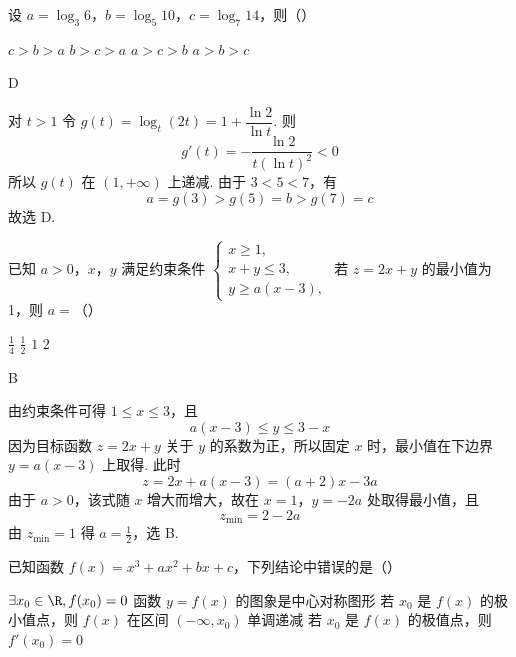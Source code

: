 \begin{problem}
设 \(a = \log_{3} 6\)，\(b = \log_{5} 10\)，\(c = \log_{7} 14\)，则（\quad）

\choices
    {\(c > b > a\)}
    {\(b > c > a\)}
    {\(a > c > b\)}
    {\(a > b > c\)}
\end{problem}

\begin{answer}
D
\end{answer}

\begin{solution}
对 \(t>1\) 令 \(g(t)=\log_t(2t)=1+\dfrac{\ln2}{\ln t}\). 则
\[
g'(t)=-\frac{\ln2}{t(\ln t)^2}<0
\]
所以 \(g(t)\) 在 \((1,+\infty)\) 上递减. 由于 \(3<5<7\)，有
\[
a=g(3)>g(5)=b>g(7)=c
\]
故选 D.
\end{solution}

\begin{problem}
已知 \(a > 0\)，\(x\)，\(y\) 满足约束条件 \(\begin{cases}
x \geqslant 1,\\
x + y \leqslant 3,\\
y \geqslant a (x - 3),
\end{cases}\) 若 \(z = 2x + y\) 的最小值为 1，则 \(a =\)（\quad）

\choices
    {\(\frac{1}{4}\)}
    {\(\frac{1}{2}\)}
    {\(1\)}
    {\(2\)}
\end{problem}

\begin{answer}
B
\end{answer}

\begin{solution}
由约束条件可得 \(1\leqslant x\leqslant3\)，且
\[
a(x-3)\leqslant y\leqslant3-x
\]
因为目标函数 \(z=2x+y\) 关于 \(y\) 的系数为正，所以固定 \(x\) 时，最小值在下边界 \(y=a(x-3)\) 上取得. 此时
\[
z=2x+a(x-3)=(a+2)x-3a
\]
由于 \(a>0\)，该式随 \(x\) 增大而增大，故在 \(x=1\)，\(y=-2a\) 处取得最小值，且
\[
z_{\min}=2-2a
\]
由 \(z_{\min}=1\) 得 \(a=\frac12\)，选 B.
\end{solution}

\begin{problem}
已知函数 \(f(x) = x^3 + ax^2 + bx + c\)，下列结论中错误的是（\quad）

\choices
    {\(\exists x_0 \in \R, f(x_0) = 0\)}
    {函数 \(y = f(x)\) 的图象是中心对称图形}
    {若 \(x_0\) 是 \(f(x)\) 的极小值点，则 \(f(x)\) 在区间 \((-\infty, x_0)\) 单调递减}
    {若 \(x_0\) 是 \(f(x)\) 的极值点，则 \(f'(x_0) = 0\)}
\end{problem}

